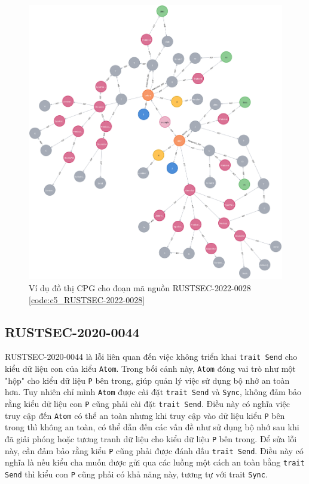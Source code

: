 \begin{figure}[H]
    \includegraphics[width=1\columnwidth]{figures/c5/c5_RUSTSEC-2022-0028.png}
    \centering
    \caption{Ví dụ đồ thị CPG cho đoạn mã nguồn RUSTSEC-2022-0028 \ref{code:c5_RUSTSEC-2022-0028}}
    \label{img:c5_RUSTSEC-2022-0028}
\end{figure}

\subsection{RUSTSEC-2020-0044}

RUSTSEC-2020-0044 là lỗi liên quan đến việc không triển khai \texttt{trait Send} cho kiểu dữ liệu con của kiểu \texttt{Atom}.
Trong bối cảnh này, \texttt{Atom} đóng vai trò như một "hộp" cho kiểu dữ liệu \texttt{P} bên trong, giúp quản lý việc sử dụng bộ nhớ an toàn hơn.
Tuy nhiên chỉ mình \texttt{Atom} được cài đặt \texttt{trait Send} và \texttt{Sync}, không đảm bảo rằng kiểu dữ liệu con \texttt{P} cũng phải cài đặt \texttt{trait Send}.
Điều này có nghĩa việc truy cập đến \texttt{Atom} có thể an toàn nhưng khi truy cập vào dữ liệu kiểu \texttt{P} bên trong thì không an toàn, có thể dẫn đến các vấn đề như sử dụng bộ nhớ sau khi đã giải phóng hoặc tương tranh dữ liệu cho kiểu dữ liệu \texttt{P} bên trong.
Để sửa lỗi này, cần đảm bảo rằng kiểu \texttt{P} cũng phải được đánh dấu \texttt{trait Send}.
Điều này có nghĩa là nếu kiểu cha muốn được gửi qua các luồng một cách an toàn bằng \texttt{trait Send} thì kiểu con \texttt{P} cũng phải có khả năng này, tương tự với trait \texttt{Sync}.

